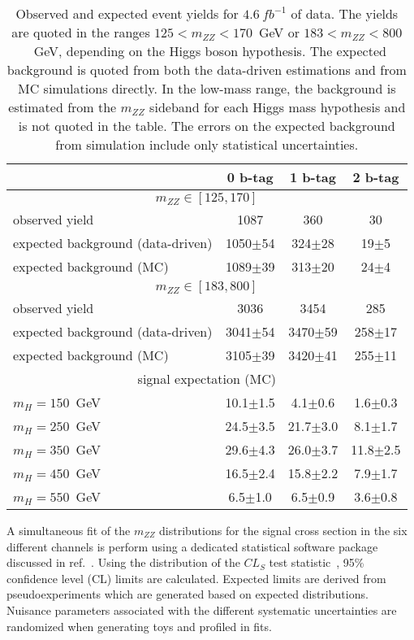\begin{table}
\begin{center}
\begin{tabular}{l|c|c|c}
\hline \hline
 & 0 b-tag & 1 b-tag & 2 b-tag \\ \hline \hline
\multicolumn{4}{c}{$m_{ZZ} \in [125,170]$} \\ \hline
observed yield & 1087 & 360  & 30 \\
expected background (data-driven) & 1050$\pm$54 & 324$\pm$28 & 19$\pm$5 \\ 
expected background (MC)& 1089$\pm$39 & 313$\pm$20 & 24$\pm$4 \\ \hline \hline
\multicolumn{4}{c}{$m_{ZZ} \in [183,800]$} \\ \hline
observed yield & 3036 & 3454  & 285 \\
expected background (data-driven) & 3041$\pm$54 & 3470$\pm$59 & 258$\pm$17 \\ 
expected background (MC)& 3105$\pm$39 & 3420$\pm$41 & 255$\pm$11 \\ \hline \hline
\multicolumn{4}{c}{signal expectation (MC)} \\  \hline
$m_H=150$~GeV & 10.1$\pm$1.5 & 4.1$\pm$0.6 & 1.6$\pm$0.3 \\ \hline
$m_H=250$~GeV & 24.5$\pm$3.5 & 21.7$\pm$3.0 & 8.1$\pm$1.7 \\ \hline
$m_H=350$~GeV & 29.6$\pm$4.3 & 26.0$\pm$3.7 & 11.8$\pm$2.5 \\ \hline
$m_H=450$~GeV & 16.5$\pm$2.4 & 15.8$\pm$2.2 & 7.9$\pm$1.7 \\ \hline
$m_H=550$~GeV & 6.5$\pm$1.0 & 6.5$\pm$0.9 & 3.6$\pm$0.8 \\ \hline
\hline \hline
\end{tabular}
\caption{Observed and expected event yields for $4.6~fb^{-1}$ of
data.  The yields are quoted  in the ranges $125<m_{ZZ}<170$~GeV
or $183<m_{ZZ}<800$~GeV, depending on the Higgs boson hypothesis.
The expected  background is quoted from both the data-driven 
estimations and from MC simulations directly. In the low-mass
range, the background  is estimated from the $m_{ZZ}$ sideband
for each  Higgs mass hypothesis and is not quoted in the table.
The errors on the expected  background  from simulation include
only statistical uncertainties.}
\label{table:HZZ2l2qYields}
\end{center}
\end{table}

A simultaneous fit of the $m_{ZZ}$ distributions for the signal 
cross section in the six different channels is perform using a 
dedicated statistical software package discussed in 
ref.~\cite{Chatrchyan:2012tx}.  Using the distribution of the $CL_S$ test 
statistic~\cite{Read:2002hq}, 95\% confidence level (CL) limits are
calculated.  Expected limits are derived from pseudoexperiments
which are generated based on expected distributions.  Nuisance
parameters associated with the different systematic uncertainties
are randomized when generating toys and profiled in fits.  

